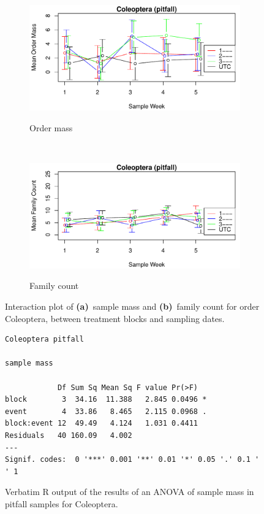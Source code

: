 \documentclass[10pt,letterpaper,twocolumn]{article}
\begin{document}
\begin{figure}[h]
	\centering
	\begin{subfigure}[b]{0.45\textwidth}
		\caption{Order mass}
		\includegraphics[width=\textwidth]{plots/blocks/interaction/mass/mass_pitfall_Coleoptera_interplot.pdf}
		\label{fig:pitfall_coleoptera_mass_interplot}
	\end{subfigure}
	~
	\begin{subfigure}[b]{0.45\textwidth}
		\caption{Family count}
		\includegraphics[width=\textwidth]{plots/blocks/interaction/family/family_pitfall_Coleoptera_interplot.pdf}
		\label{fig:pitfall_coleoptera_family_interplot}
	\end{subfigure}
	\caption{Interaction plot of \textbf{(a)}~sample mass and \textbf{(b)}~family count for order Coleoptera, between treatment blocks and sampling dates.}
	\label{fig:pitfall_coleoptera_interplot}
	\smallskip
	\nointerlineskip
	\hrulefill
\end{figure}

\begin{figure}[h]
	\lstset{numbers=left}
	\lstset{xleftmargin=5mm,framexleftmargin=5mm}
	\begin{lstlisting}
Coleoptera pitfall 

sample mass 

            Df Sum Sq Mean Sq F value Pr(>F)  
block        3  34.16  11.388   2.845 0.0496 *
event        4  33.86   8.465   2.115 0.0968 .
block:event 12  49.49   4.124   1.031 0.4411  
Residuals   40 160.09   4.002                 
---
Signif. codes:  0 '***' 0.001 '**' 0.01 '*' 0.05 '.' 0.1 ' ' 1   
	\end{lstlisting}
	\caption{Verbatim R output of the results of an ANOVA of sample mass in pitfall samples for Coleoptera.}
	\label{fig:pitfall_coleoptera_mass_anova}
	\smallskip
	\nointerlineskip
	\hrulefill
\end{figure}
\end{document}
